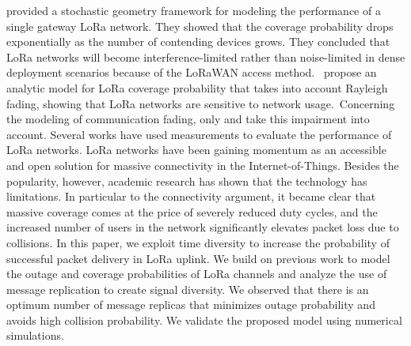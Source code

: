 \citet{georgiou_low_2017} provided a stochastic geometry framework for modeling the performance of a single gateway LoRa network. They showed that the coverage probability drops exponentially as the number of contending devices grows. They concluded that LoRa networks will become interference-limited rather than noise-limited in dense deployment scenarios because of the LoRaWAN access method.~\citet{georgiou_low_2017} propose an analytic model for LoRa coverage probability that takes into account Rayleigh fading, showing that LoRa networks are sensitive to network usage.~Concerning the modeling of communication fading, only \citet{georgiou_low_2017} and \citet{pop_does_2017} take this impairment into account. Several works have used measurements to evaluate the performance of LoRa networks.   \newline 
 \cite{hoeller_exploiting_2018}   LoRa networks have been gaining momentum as an accessible and open solution for massive connectivity in the Internet-of-Things. Besides the popularity, however, academic research has shown that the technology has limitations. In particular to the connectivity argument, it became clear that massive coverage comes at the price of severely reduced duty cycles, and the increased number of users in the network significantly elevates packet loss due to collisions. In this paper, we exploit time diversity to increase the probability of successful packet delivery in LoRa uplink. We build on previous work to model the outage and coverage probabilities of LoRa channels and analyze the use of message replication to create signal diversity. We observed that there is an optimum number of message replicas that minimizes outage probability and avoids high collision probability. We validate the proposed model using numerical simulations. \cite{bouzouita_estimating_2018}   \newline 
 \cite{callebaut_*cross-layer_2018}    \newline 
 \cite{chen_viable_2018}    \newline 
 \cite{dawaliby_adaptive_2019}    \newline 
 \cite{dix-matthews_lora_2018}    \newline 
 \cite{farooq_search_2018}    \newline 
 \cite{hoeller_analysis_2018}    \newline 
 \cite{karmakar_linkcon_2017}    \newline 
 \cite{kerkouche_node-based_2018}    \newline 
 \cite{kim_experiencing_2019}    \newline 
